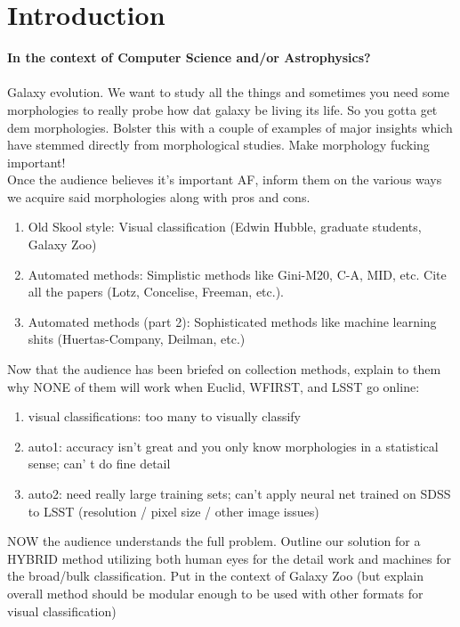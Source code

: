 \documentclass[twocolumn]{aastex6}
\begin{document}
\section{Introduction} \label{sec:intro}
\textbf{In the context of Computer Science and/or Astrophysics?} \\
\\
Galaxy evolution. We want to study all the things and sometimes you need some morphologies to really probe how dat galaxy be living its life. So you gotta get dem morphologies. Bolster this with a couple of examples of major insights which have stemmed directly from morphological studies. Make morphology fucking important!\\
Once the audience believes it's important AF, inform them on the various ways we acquire said morphologies along with pros and cons.\\
\begin{enumerate}
\item Old Skool style: Visual classification (Edwin Hubble, graduate students, Galaxy Zoo) \\
\item Automated methods: Simplistic methods like Gini-M20, C-A, MID, etc. Cite all the papers (Lotz, Concelise, Freeman, etc.). \\
\item Automated methods (part 2): Sophisticated methods like machine learning shits (Huertas-Company, Deilman, etc.) \\
\end{enumerate}
Now that the audience has been briefed on collection methods, explain to them why NONE of them will work when Euclid, WFIRST, and LSST go online: 
\begin{enumerate}
\item visual classifications:  too many to visually classify 
\item auto1:  accuracy isn't great and you only know morphologies in a statistical sense; can' t do fine detail
\item auto2: need really large training sets; can't apply neural net trained on SDSS to LSST (resolution / pixel size / other image issues)
\end{enumerate}
NOW the audience understands the full problem. Outline our solution for a HYBRID method utilizing both human eyes for the detail work and machines for the broad/bulk classification. Put in the context of Galaxy Zoo (but explain overall method should be modular enough to be used with other formats for visual classification)
\end{document}
